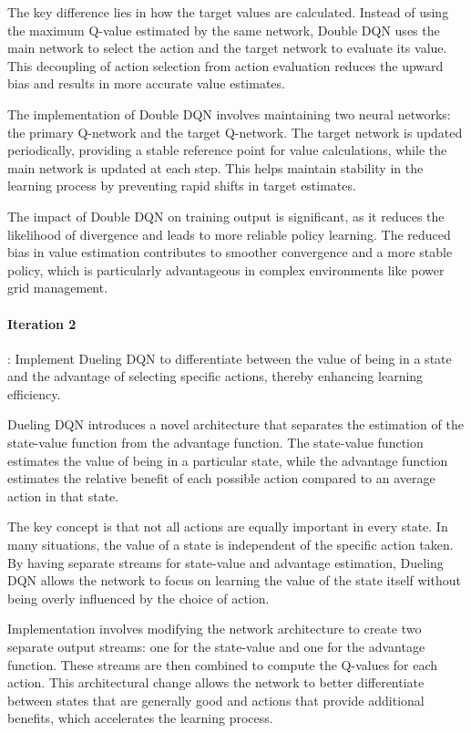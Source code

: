 \documentclass[
12pt, %
oneside, %
english, %
onehalfspacing, %
nolistspacing, %
liststotoc, %
headsepline, %
]{ProposalAndThesis} %
\begin{document}
The key difference lies in how the target values are calculated. Instead of using the maximum Q-value estimated by the same network, Double DQN uses the main network to select the action and the target network to evaluate its value. This decoupling of action selection from action evaluation reduces the upward bias and results in more accurate value estimates.

The implementation of Double DQN involves maintaining two neural networks: the primary Q-network and the target Q-network. The target network is updated periodically, providing a stable reference point for value calculations, while the main network is updated at each step. This helps maintain stability in the learning process by preventing rapid shifts in target estimates.

The impact of Double DQN on training output is significant, as it reduces the likelihood of divergence and leads to more reliable policy learning. The reduced bias in value estimation contributes to smoother convergence and a more stable policy, which is particularly advantageous in complex environments like power grid management.

\paragraph{Iteration 2}: Implement Dueling DQN to differentiate between the value of being in a state and the advantage of selecting specific actions, thereby enhancing learning efficiency.

Dueling DQN introduces a novel architecture that separates the estimation of the state-value function from the advantage function. The state-value function estimates the value of being in a particular state, while the advantage function estimates the relative benefit of each possible action compared to an average action in that state.

The key concept is that not all actions are equally important in every state. In many situations, the value of a state is independent of the specific action taken. By having separate streams for state-value and advantage estimation, Dueling DQN allows the network to focus on learning the value of the state itself without being overly influenced by the choice of action.

Implementation involves modifying the network architecture to create two separate output streams: one for the state-value and one for the advantage function. These streams are then combined to compute the Q-values for each action. This architectural change allows the network to better differentiate between states that are generally good and actions that provide additional benefits, which accelerates the learning process.
\end{document}
